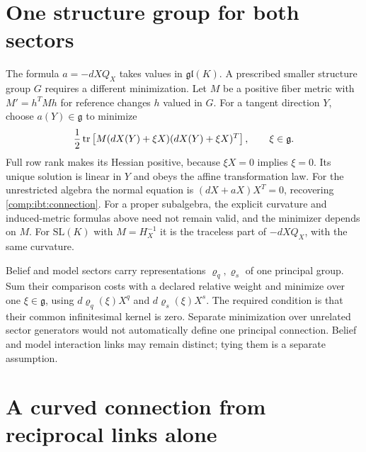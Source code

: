 \section{One structure group for both sectors}

The formula $a=-dXQ_X$ takes values in $\mathfrak{gl}(K)$. A prescribed smaller structure group $G$ requires a different minimization. Let $M$ be a positive fiber metric with $M'=h^TMh$ for reference changes $h$ valued in $G$. For a tangent direction $Y$, choose $a(Y)\in\mathfrak g$ to minimize
\begin{equation}
\frac12\operatorname{tr}\left[M(dX(Y)+\xi X)(dX(Y)+\xi X)^T\right],
\qquad \xi\in\mathfrak g.
\end{equation}
Full row rank makes its Hessian positive, because $\xi X=0$ implies $\xi=0$. Its unique solution is linear in $Y$ and obeys the affine transformation law. For the unrestricted algebra the normal equation is $(dX+aX)X^T=0$, recovering \cref{comp:ibt:connection}. For a proper subalgebra, the explicit curvature and induced-metric formulas above need not remain valid, and the minimizer depends on $M$. For $\mathrm{SL}(K)$ with $M=H_X^{-1}$ it is the traceless part of $-dXQ_X$, with the same curvature.

Belief and model sectors carry representations $\varrho_q,\varrho_s$ of one principal group. Sum their comparison costs with a declared relative weight and minimize over one $\xi\in\mathfrak g$, using $d\varrho_q(\xi)X^q$ and $d\varrho_s(\xi)X^s$. The required condition is that their common infinitesimal kernel is zero. Separate minimization over unrelated sector generators would not automatically define one principal connection. Belief and model interaction links may remain distinct; tying them is a separate assumption.

\section{A curved connection from reciprocal links alone}

